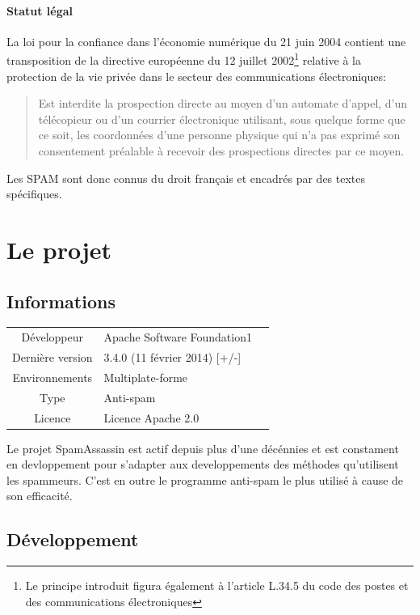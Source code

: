 \documentclass[a4paper,11pt]{article}
\begin{document}
\paragraph{Statut légal}


La loi pour la confiance dans l'économie numérique du 21 juin 2004 contient une transposition de la
directive européenne du 12 juillet 2002\footnote{Le principe introduit figura également à l'article L.34.5 du code 
des postes et des communications électroniques } relative à la protection de la vie privée dans le secteur des communications
électroniques:
\begin{quote}
 Est interdite la prospection directe au moyen d'un automate d'appel, d'un télécopieur ou d'un courrier électronique utilisant,
 sous quelque forme que ce soit, les coordonnées d'une personne physique qui n'a pas exprimé son consentement préalable à recevoir
 des prospections directes par ce moyen. 
\end{quote}
Les SPAM sont donc connus du droit français et encadrés par des textes spécifiques.

\section{Le projet}

\subsection{Informations}

\begin{center}
\begin{tabular}{cll}
Développeur & Apache Software Foundation1  \\
Dernière version & 3.4.0 (11 février 2014) [+/-] \\
Environnements & Multiplate-forme  \\
Type & Anti-spam & \\
Licence & Licence Apache 2.0 

\end{tabular}
\end{center}

Le projet SpamAssassin est actif depuis plus d'une décénnies et est constament en devloppement 
pour s'adapter aux developpements des méthodes qu'utilisent les spammeurs. C'est en outre le programme anti-spam le plus utilisé à cause de son efficacité.

\subsection{Développement}
\end{document}
